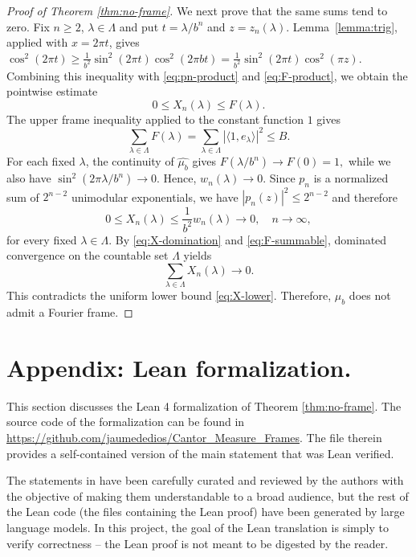 \documentclass[reqno,a4paper,12pt]{amsart}
\begin{document}
\begin{proof}[Proof of Theorem \ref{thm:no-frame}]
We next prove that the same sums tend to zero. Fix $n\ge2$,
$\lambda\in\Lambda$ and put $t=\lambda/b^n$ and $z=z_n(\lambda)$.
Lemma~\ref{lemma:trig}, applied with $x=2\pi t$, gives
$
        \cos^2(2\pi t)
        \ge
        \frac1{b^2}\sin^2(2\pi t)\cos^2(2\pi bt)
        =
        \frac1{b^2}\sin^2(2\pi t)\cos^2(\pi z).
$
Combining this inequality with \eqref{eq:pn-product} and
\eqref{eq:F-product}, we obtain the pointwise estimate
\begin{equation}\label{eq:X-domination}
        0\le X_n(\lambda)\le F(\lambda).
\end{equation}
The upper frame inequality applied to the constant function $1$ gives
\begin{equation}\label{eq:F-summable}
        \sum_{\lambda\in\Lambda}F(\lambda)
        =
        \sum_{\lambda\in\Lambda}|\langle 1,e_\lambda\rangle|^2
        \le B.
\end{equation}
For each fixed $\lambda$, the continuity of $\widehat{\mu_b}$ gives
$
        F(\lambda/b^n) \to F(0)=1,
$
while we also have
$
        \sin^2(2\pi\lambda/b^n)\to 0.
$
Hence, $w_n(\lambda)\to0$. Since $p_n$ is a normalized sum of
$2^{n-2}$ unimodular exponentials, we have
$
        |p_n(z)|^2\le 2^{n-2}
$
and therefore
$$
        0\le X_n(\lambda)\le \frac1{b^2}w_n(\lambda)\to 0,
        \quad n\to\infty,
$$
for every fixed $\lambda\in\Lambda$. By \eqref{eq:X-domination} and
\eqref{eq:F-summable}, dominated convergence on the countable set
$\Lambda$ yields
\begin{equation}\label{eq:X-vanishing}
        \sum_{\lambda\in\Lambda}X_n(\lambda)\to 0.
\end{equation}
This contradicts the uniform lower bound \eqref{eq:X-lower}. Therefore,
$\mu_b$ does not admit a Fourier frame.
\end{proof}


\section{Appendix: Lean formalization.}

This section discusses the Lean 4 \cite{lean4} formalization of Theorem \ref{thm:no-frame}. The source code of the formalization can be found in \url{https://github.com/jaumededios/Cantor_Measure_Frames}. The file  therein provides a self-contained version of the main statement that was Lean verified. 

The statements in  have been carefully curated and reviewed by the authors with the objective of making them understandable to a broad audience, but the rest of the Lean code (the files containing the Lean proof) have been generated by large language models. In this project, the goal of the Lean translation is simply to verify correctness -- the Lean proof is not meant to be digested by the reader.
\end{document}
